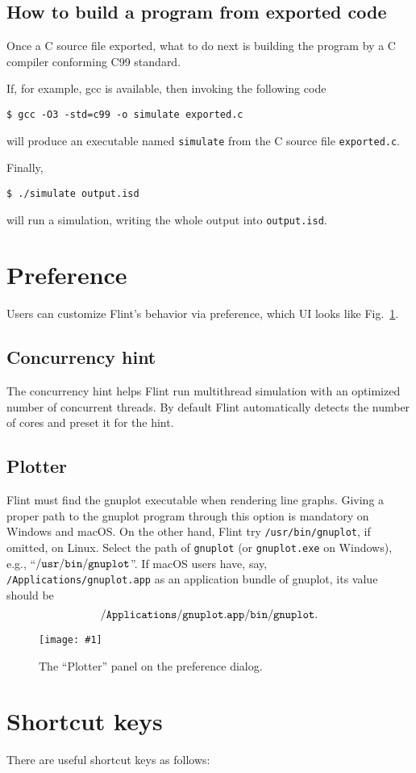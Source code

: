 \documentclass[a4paper,10pt]{report}
\newcommand{\filename}[1]{{\tt #1}}
\newcommand\FigureOfImage[2]{\begin{figure}[h]
  \centering
  \texttt{[image: \#1]}
  \caption{#2}\label{fig:#1}
\end{figure}}
\begin{document}
\subsection{How to build a program from exported code}
Once a C source file exported, what to do next is building the program by a C compiler
conforming C99 standard.

If, for example, gcc is available, then invoking the following code
\begin{verbatim}
$ gcc -O3 -std=c99 -o simulate exported.c
\end{verbatim}
will produce an executable named {\tt simulate} from the C source file {\tt exported.c}.

Finally,
\begin{verbatim}
$ ./simulate output.isd
\end{verbatim}
will run a simulation, writing the whole output into {\tt output.isd}.

\section{Preference}
\label{sec:preference}
Users can customize Flint's behavior via preference, which UI looks like
Fig.~\ref{fig:preference-plotter}.

\subsection{Concurrency hint}
The concurrency hint helps Flint run multithread simulation with an optimized number
of concurrent threads. By default Flint automatically detects the number of cores and
preset it for the hint.

\subsection{Plotter}
Flint must find the gnuplot executable when rendering line graphs.
Giving a proper path to the gnuplot program through this option is mandatory on
Windows and macOS. On the other hand, Flint try \filename{/usr/bin/gnuplot}, if
omitted, on Linux.
Select the path of {\tt gnuplot} (or {\tt gnuplot.exe} on Windows), e.g.,
``$\tt{/usr/bin/gnuplot}$''. If macOS users have, say,
{\tt /Applications/gnuplot.app} as an application bundle of gnuplot,
its value should be \[{\tt /Applications/gnuplot.app/bin/gnuplot}.\]
\FigureOfImage{preference-plotter}{The ``Plotter'' panel on the preference dialog.}

\section{Shortcut keys}
There are useful shortcut keys as follows:
\end{document}
